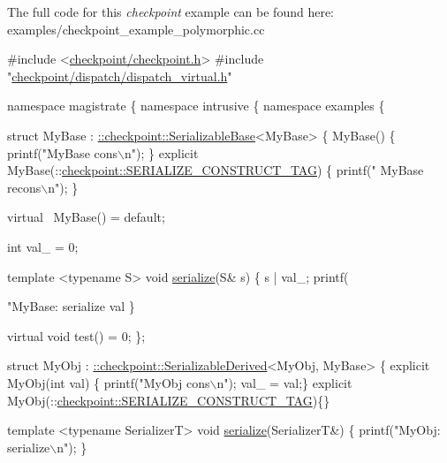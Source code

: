 The full code for this {\itshape checkpoint} example can be found here\+: {\ttfamily examples/checkpoint\+\_\+example\+\_\+polymorphic.\+cc}


\begin{DoxyCodeInclude}

\textcolor{preprocessor}{#include <\hyperlink{checkpoint_8h}{checkpoint/checkpoint.h}>}
\textcolor{preprocessor}{#include "\hyperlink{dispatch__virtual_8h}{checkpoint/dispatch/dispatch\_virtual.h}"}

\textcolor{keyword}{namespace }magistrate \{ \textcolor{keyword}{namespace }intrusive \{ \textcolor{keyword}{namespace }examples \{

\textcolor{keyword}{struct }MyBase : \hyperlink{structcheckpoint_1_1dispatch_1_1vrt_1_1_serializable_base}{::checkpoint::SerializableBase}<MyBase> \{
  MyBase() \{ printf(\textcolor{stringliteral}{"MyBase cons\(\backslash\)n"}); \}
  \textcolor{keyword}{explicit} MyBase(::\hyperlink{structcheckpoint_1_1dispatch_1_1_s_e_r_i_a_l_i_z_e___c_o_n_s_t_r_u_c_t___t_a_g}{checkpoint::SERIALIZE\_CONSTRUCT\_TAG}) \{ printf(\textcolor{stringliteral}{"
      MyBase recons\(\backslash\)n"}); \}

  \textcolor{keyword}{virtual} ~MyBase() = \textcolor{keywordflow}{default};

  \textcolor{keywordtype}{int} val\_ = 0;

  \textcolor{keyword}{template} <\textcolor{keyword}{typename} S>
  \textcolor{keywordtype}{void} \hyperlink{namespacecheckpoint_a075da4e7344cf037943362517e606c3a}{serialize}(S& s) \{
    s | val\_;
    printf(\textcolor{stringliteral}{"MyBase: serialize val %
  \}

  \textcolor{keyword}{virtual} \textcolor{keywordtype}{void} test() = 0;
\};

\textcolor{keyword}{struct }MyObj : \hyperlink{structcheckpoint_1_1dispatch_1_1vrt_1_1_serializable_derived}{::checkpoint::SerializableDerived}<MyObj, MyBase> \{
  \textcolor{keyword}{explicit} MyObj(\textcolor{keywordtype}{int} val) \{ printf(\textcolor{stringliteral}{"MyObj cons\(\backslash\)n"}); val\_ = val;\}
  \textcolor{keyword}{explicit} MyObj(::\hyperlink{structcheckpoint_1_1dispatch_1_1_s_e_r_i_a_l_i_z_e___c_o_n_s_t_r_u_c_t___t_a_g}{checkpoint::SERIALIZE\_CONSTRUCT\_TAG})\{\}

  \textcolor{keyword}{template} <\textcolor{keyword}{typename} SerializerT>
  \textcolor{keywordtype}{void} \hyperlink{namespacecheckpoint_a075da4e7344cf037943362517e606c3a}{serialize}(SerializerT&) \{
    printf(\textcolor{stringliteral}{"MyObj: serialize\(\backslash\)n"});
  \}

}
\end{DoxyCodeInclude}
